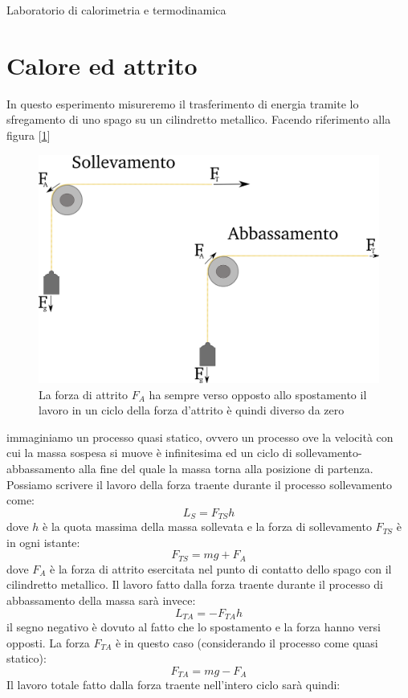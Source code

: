 \documentclass[a4paper,10pt,oneside]{article}
\begin{document}
\begin{center}
{\huge Laboratorio di calorimetria e termodinamica}
\end{center} 

\section{Calore ed attrito}

In questo esperimento misureremo il trasferimento di energia tramite lo sfregamento di uno spago su un cilindretto metallico. Facendo riferimento alla figura [\ref{fig:attrito1}]
\begin{figure}[H]
 \centering
 \includegraphics[width=\textwidth]{Immagini/attrito.png}
 \caption{La forza di attrito $F_A$ ha sempre verso opposto allo spostamento il lavoro in un ciclo della forza d'attrito è quindi diverso da zero}
 \label{fig:attrito1}
\end{figure}
immaginiamo un processo quasi statico, ovvero un processo ove la velocità con cui la massa sospesa si muove è infinitesima ed un ciclo di sollevamento-abbassamento alla fine del quale la massa torna alla posizione di partenza.
Possiamo scrivere il lavoro della forza traente durante il processo sollevamento come:
\begin{equation}
 L_S=F_{TS}h
\end{equation}
 dove $h$ è la quota massima della massa sollevata e la forza di sollevamento $F_{TS}$ è in ogni istante:
\begin{equation}
 F_{TS}=mg+F_A
\end{equation}
dove $F_A$ è la forza di attrito esercitata nel punto di contatto dello spago con il cilindretto metallico.
Il lavoro fatto dalla forza traente durante il processo di abbassamento della massa sarà invece:
\begin{equation}
 L_{TA}=-F_{TA}h
\end{equation}
il segno negativo è dovuto al fatto che lo spostamento e la forza hanno versi opposti. La forza $F_{TA}$ è in questo caso (considerando il processo come quasi statico):
\begin{equation}
F_{TA}=mg-F_A
\end{equation}
Il lavoro totale fatto dalla forza traente nell'intero ciclo sarà quindi:
\end{document}
